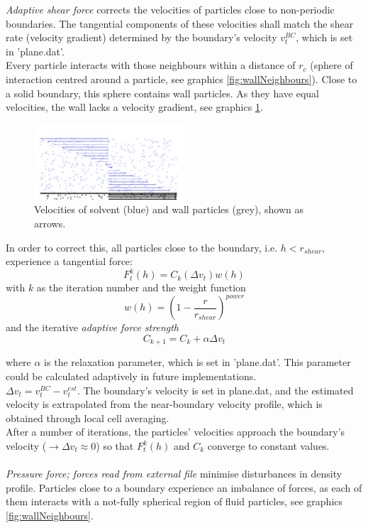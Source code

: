 \documentclass[a4paper,10pt]{scrreprt}
\begin{document}
\textit{Adaptive shear force} corrects the velocities of particles close to non-periodic boundaries. The tangential components of these velocities shall match the shear rate (velocity gradient) determined by the boundary's velocity $v_t^{ BC}$, which is set in 'plane.dat'.\\Every particle interacts with those neighbours within a distance of $r_c$ (sphere of interaction centred around a particle, see graphics \ref{fig:wallNeighbours}). Close to a solid boundary, this sphere contains wall particles. As they have equal velocities, the wall lacks a velocity gradient, see graphics \ref{fig:adaptShear}.

\begin{figure}
\includegraphics[width=0.5\textwidth]{adaptiveShearForce.pdf}
\caption{Velocities of solvent (blue) and wall particles (grey), shown as arrows.\label{fig:adaptShear}}
\end{figure}

In order to correct this, all particles close to the boundary, i.e. $h < r_{ shear}$, experience a tangential force:
\begin{equation}
F_t^k(h) = C_k\left(\Delta v_t \right) w(h)
\label{eq:adaptive_shear_force}
\end{equation}
with $k$ as the iteration number and the weight function
\begin{equation}
w(h) = \left(1 - \frac{r}{r_{shear}} \right)^{power}
\label{eq:adaptive_sf_weight_fct}
\end{equation}
and the iterative \textit{adaptive force strength}
\begin{equation}
C_{k+1} = C_k + \alpha \Delta v_t
\label{eq:adaptive_force_strength}
\end{equation}

where $\alpha$ is the relaxation parameter, which is set in 'plane.dat'. This parameter could be calculated adaptively in future implementations.\\$\Delta v_t = v_t^{ BC} - v_t^{ est}$. The boundary's velocity is set in plane.dat, and the estimated velocity is extrapolated from the near-boundary velocity profile, which is obtained through local cell averaging.\\After a number of iterations, the particles' velocities approach the boundary's velocity ($\longrightarrow \Delta v_t \approx 0$) so that $F_t^k(h)$ and $C_k$ converge to constant values.\\
\\
\textit{Pressure force; forces read from external file} minimise disturbances in density profile. Particles close to a boundary experience an imbalance of forces, as each of them interacts with a not-fully spherical region of fluid particles, see graphics \ref{fig:wallNeighbours}.
\end{document}
